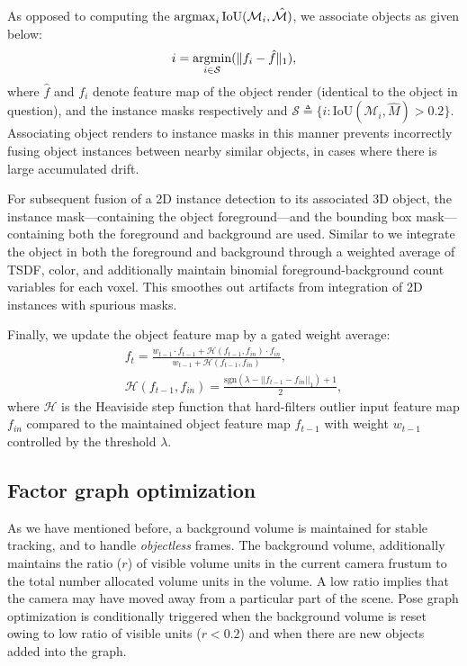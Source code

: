 As opposed to computing the $\operatorname*{\arg\!\max}_{i}{\text{IoU}(\mathcal{M}_i, \hat{\mathcal{M})}}$, we associate objects as given below:
\begin{align}
    i = \operatorname*{\arg\!\min}_{i \in \mathcal{S}} (\| f_i - \hat{f} \|_1),
\end{align}
where $\hat{f}$ and $f_i$ denote feature map of the object render (identical to the object in question), and the instance masks respectively and $\mathcal{S} \triangleq \{i : \text{IoU}(\mathcal{M}_i, \hat{M}) > 0.2\}$.
Associating object renders to instance masks in this manner prevents incorrectly fusing object instances between nearby similar objects, in cases where there is large accumulated drift.


For subsequent fusion of a 2D instance detection to its associated 3D object, the instance mask---containing the object foreground---and the bounding box mask---containing both the foreground and background are used. Similar to \cite{mccormacFusionVolumetricObjectLevel2018} we integrate the object in both the foreground and background through a weighted average of TSDF, color, and additionally maintain binomial foreground-background count variables for each voxel. This smoothes out artifacts from integration of 2D instances with spurious masks.

Finally, we update the object feature map by a gated weight average:
\begin{align}
    f_t = \frac{w_{t-1} \cdot f_{t-1} + \mathcal{H}(f_{t-1}, f_{in}) \cdot f_{in}}{w_{t-1} + \mathcal{H}(f_{t-1}, f_{in})},\\
    \mathcal{H}(f_{t-1}, f_{in}) = \frac{\textrm{sgn}(\lambda - ||f_{t-1} - f_{in}||_1) + 1}{2},
\end{align}
where $\mathcal{H}$ is the Heaviside step function that hard-filters outlier input feature map $f_{in}$ compared to the maintained object feature map $f_{t-1}$ with weight $w_{t-1}$ controlled by the threshold $\lambda$.

\subsection{Factor graph optimization} \label{subsec: optimization}
As we have mentioned before, a background volume is maintained for stable tracking, and to handle \textit{objectless} frames. The background volume, additionally maintains the ratio ($r$) of visible volume units in the current camera frustum to the total number allocated volume units in the volume. A low ratio implies that the camera may have moved away from a particular part of the scene. Pose graph optimization is conditionally triggered when the background volume is reset owing to low ratio of visible units ($r < 0.2$) and when there are new objects added into the graph.

